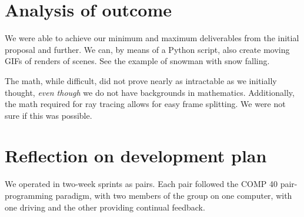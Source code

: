 \documentclass[letterpaper,twocolumn,10pt]{article}
\begin{document}








\section{Analysis of outcome}

We were able to achieve our minimum and maximum deliverables from the initial
proposal and further. We can, by means of a Python script, also create moving
GIFs of renders of scenes. See the example of snowman with snow falling.

The math, while difficult, did not prove nearly as intractable as we initially
thought, \textit{even though} we do not have backgrounds in mathematics.
Additionally, the math required for ray tracing allows for easy frame
splitting. We were not sure if this was possible.

\section{Reflection on development plan}

We operated in two-week sprints as pairs. Each pair followed the COMP 40
pair-programming paradigm, with two members of the group on one computer, with
one driving and the other providing continual feedback.
\end{document}
